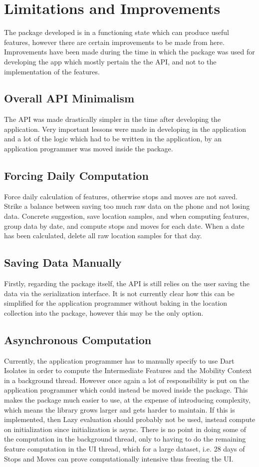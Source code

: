 \section{Limitations and Improvements}
The package developed is in a functioning state which can produce useful features, however there are certain improvements to be made from here. Improvements have been made during the time in which the package was used for developing the app which mostly pertain the the API, and not to the implementation of the features. 

\subsection{Overall API Minimalism}
The API was made drastically simpler in the time after developing the application. Very important lessons were made in developing in the application and a lot of the logic which had to be written in the application, by an application programmer was moved inside the package.


\subsection{Forcing Daily Computation}
Force daily calculation of features, otherwise stops and moves are not saved. Strike a balance between saving too much raw data on the phone and not losing data. Concrete suggestion, save location samples, and when computing features, group data by date, and compute stops and moves for each date. When a date has been calculated, delete all raw location samples for that day.

\subsection{Saving Data Manually}
Firstly, regarding the package itself, the API is still relies on the user saving the data via the serialization interface. It is not currently clear how this can be simplified for the application programmer without baking in the location collection into the package, however this may be the only option. 

\subsection{Asynchronous Computation}
Currently, the application programmer has to manually specify to use Dart Isolates in order to compute the Intermediate Features and the Mobility Context in a background thread. However once again a lot of responsibility is put on the application programmer which could instead be moved inside the package. This makes the package much easier to use, at the expense of introducing complexity, which means the library grows larger and gets harder to maintain.
If this is implemented, then Lazy evaluation should probably not be used, instead compute on initialization since initialization is async. There is no point in doing some of the computation in the background thread, only to having to do the remaining feature computation in the UI thread, which for a large dataset, i.e. 28 days of Stops and Moves can prove computationally intensive thus freezing the UI.

